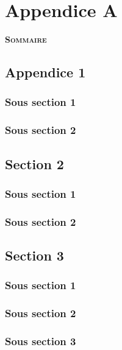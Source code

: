 
\chapter{Appendice A}

\vspace{10pt}
\begin{center} {\scshape\bfseries Sommaire} \end{center}

\startcontents[chapter]	

\smash{\rule{\textwidth}{.4pt}}
\smash{\rule{\textwidth}{.4pt}}

\vspace{20pt}

\section{Appendice 1}

\subsection{Sous section 1}
\subsection{Sous section 2}

\section{Section 2}

\subsection{Sous section 1}
\subsection{Sous section 2}

\section{Section 3}

\subsection{Sous section 1}
\subsection{Sous section 2}
\subsection{Sous section 3}


\stopcontents[chapter]
